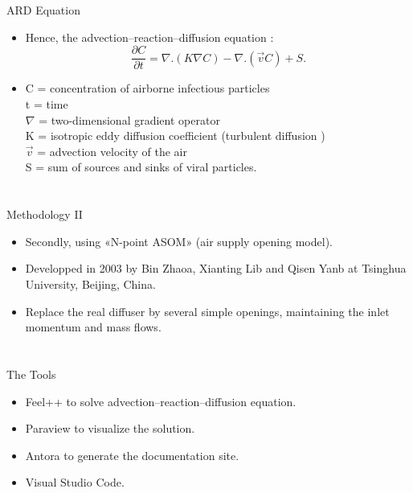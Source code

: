 \documentclass[10pt]{beamer}
\newcommand{\PVI}{}
\newcommand{\PVII}{}
\newcommand{\PVIII}{}
\begin{document}
\section{\PVI} 
\begin{frame}{ARD Equation}{\PVI} 
    \begin{itemize}

        \item Hence, the advection–reaction–diffusion equation :
        \\ $$ \frac{\partial C}{\partial t} = \nabla . (K  \nabla  C) - \nabla . (\overrightarrow{v}  C) + S.$$
        \item C = concentration of airborne infectious particles \\
        t = time \\
        $\nabla$ = two-dimensional gradient operator \\
        K = isotropic eddy diffusion coefficient (turbulent diffusion ) \\
        $\overrightarrow{v}$ = advection velocity of the air \\
        S = sum of sources and sinks of viral particles.
    \end{itemize}  

\end{frame}

\section{\PVII} 
\begin{frame}{Methodology II}{\PVII} 
    \begin{itemize}
        \item Secondly, using «N-point ASOM» (air supply opening model).
        \item Developped in 2003 by Bin Zhaoa, Xianting Lib and Qisen Yanb at Tsinghua University, Beijing, China. 
        \item Replace the real diffuser by several simple openings, maintaining the inlet momentum and mass flows.
    \end{itemize}  

\end{frame}

\section{\PVIII} 
\begin{frame}{The Tools}{\PVIII} 
    \begin{itemize}
        \item Feel++ to solve advection–reaction–diffusion equation.
        \item Paraview to visualize the solution.
        \item Antora to generate the documentation site.
        \item Visual Studio Code.
    \end{itemize}  

\end{frame}
\end{document}
